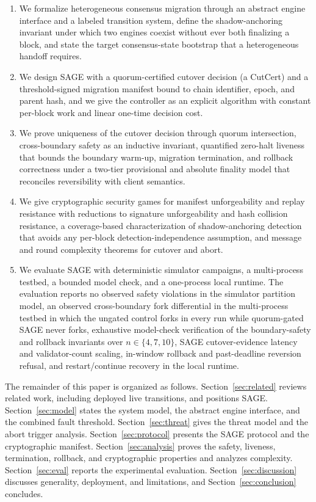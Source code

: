 \documentclass[journal]{IEEEtran}
\theoremstyle{remark}
\begin{document}
\begin{enumerate}
  \item We formalize heterogeneous consensus migration through an abstract engine interface
  and a labeled transition system, define the shadow-anchoring invariant under which two
  engines coexist without ever both finalizing a block, and state the target consensus-state
  bootstrap that a heterogeneous handoff requires.
  \item We design SAGE with a quorum-certified cutover decision (a CutCert) and a
  threshold-signed migration manifest bound to chain identifier, epoch, and parent hash, and
  we give the controller as an explicit algorithm with constant per-block work and linear
  one-time decision cost.
  \item We prove uniqueness of the cutover decision through quorum intersection,
  cross-boundary safety as an inductive invariant, quantified zero-halt liveness that bounds
  the boundary warm-up, migration termination, and rollback correctness under a two-tier
  provisional and absolute finality model that reconciles reversibility with client
  semantics.
  \item We give cryptographic security games for manifest unforgeability and replay
  resistance with reductions to signature unforgeability and hash collision resistance, a
  coverage-based characterization of shadow-anchoring detection that avoids any per-block
  detection-independence assumption, and message and round complexity theorems for cutover and abort.
  \item We evaluate SAGE with deterministic simulator campaigns, a
  multi-process testbed, a bounded model check, and a one-process local runtime. The
  evaluation reports no observed safety violations in the simulator partition
  model, an observed cross-boundary fork differential in the multi-process testbed in which the
  ungated control forks in every run while quorum-gated SAGE never forks, exhaustive model-check
  verification of the boundary-safety and rollback invariants over $n\in\{4,7,10\}$, SAGE
  cutover-evidence latency and validator-count scaling, in-window rollback and past-deadline
  reversion refusal, and restart/continue recovery in the local runtime.
\end{enumerate}

The remainder of this paper is organized as follows. Section~\ref{sec:related} reviews
related work, including deployed live transitions, and positions SAGE.
Section~\ref{sec:model} states the system model, the abstract engine interface, and the
combined fault threshold. Section~\ref{sec:threat} gives the threat model and the abort
trigger analysis. Section~\ref{sec:protocol} presents the SAGE protocol and the
cryptographic manifest. Section~\ref{sec:analysis} proves the safety, liveness,
termination, rollback, and cryptographic properties and analyzes complexity.
Section~\ref{sec:eval} reports the experimental evaluation. Section~\ref{sec:discussion}
discusses generality, deployment, and limitations, and Section~\ref{sec:conclusion}
concludes.
\end{document}
